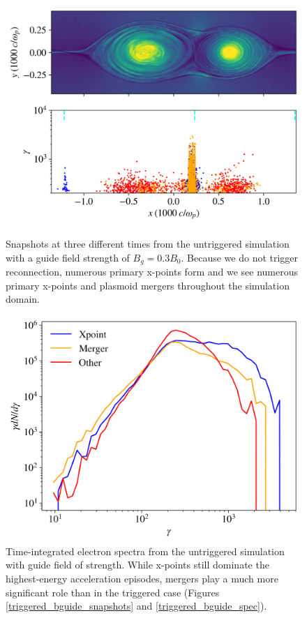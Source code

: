 \documentclass[iop,twocolappendix]{emulateapj}
\begin{document}
\begin{figure}[!h]
{	}
	\newline
	{
		\includegraphics[width=\linewidth]{untriggered_bguide_snapshot45.png}
	}
	
	\caption{Snapshots at three different times from the untriggered simulation with a guide field strength of $B_{g}=0.3B_{0}$.  Because we do not trigger reconnection, numerous primary x-points form and we see numerous primary x-points and plasmoid mergers throughout the simulation domain.
	}
	\label{untriggered_bguide_snapshots}
\end{figure}

\begin{figure}[htp]
	
	\includegraphics[width=\linewidth]{untriggered_bguide_spec.png}
	\caption{Time-integrated electron spectra from the untriggered simulation with guide field of strength.  While x-points still dominate the highest-energy acceleration episodes, mergers play a much more significant role than in the triggered case (Figures \ref{triggered_bguide_snapshots} and \ref{triggered_bguide_spec}).}
	\label{untriggered_bguide_spec}
\end{figure}
\end{document}

